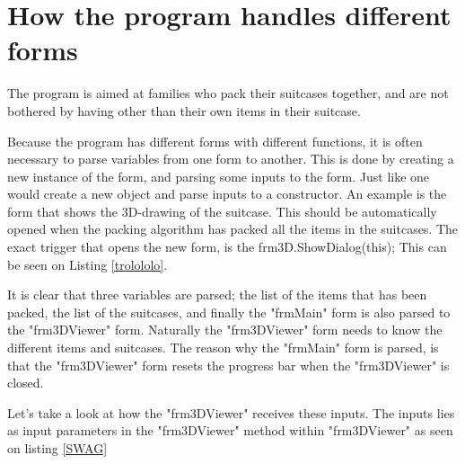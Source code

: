 \section{How the program handles different forms}
The program is aimed at families who pack their suitcases together, and are not bothered by having other than their own items in their suitcase. 

Because the program has different forms with different functions, it is often necessary to parse variables from one form to another. This is done by creating a new instance of the form, and parsing some inputs to the form. Just like one would create a new object and parse inputs to a constructor. An example is the form that shows the 3D-drawing of the suitcase. This should be automatically opened when the packing algorithm has packed all the items in the suitcases. The exact trigger that opens the new form, is the frm3D.ShowDialog(this); This can be seen on Listing \ref{trolololo}. 


It is clear that three variables are parsed; the list of the items that has been packed, the list of the suitcases, and finally the "frmMain" form is also parsed to the "frm3DViewer" form. Naturally the "frm3DViewer" form needs to know the different items and suitcases. The reason why the "frmMain" form is parsed, is that the "frm3DViewer" form resets the progress bar when the "frm3DViewer" is closed. 

Let's take a look at how the "frm3DViewer" receives these inputs. The inputs lies as input parameters in the "frm3DViewer" method within "frm3DViewer" as seen on listing \ref{SWAG}

